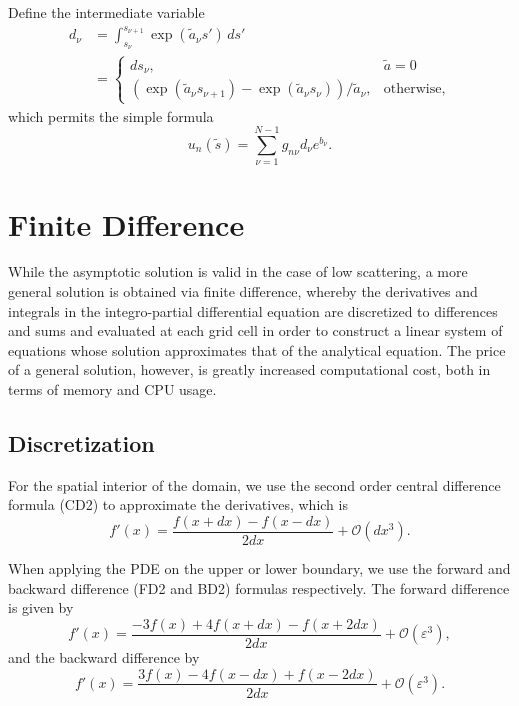 Define the intermediate variable
\begin{align*}
  d_\nu &= \int_{s_\nu}^{s_{\nu+1}}  \exp\left(\tilde{a}_{\nu}s'\right)\, ds' \\
    &= \begin{cases}
    ds_\nu, & \tilde{a} = 0 \\
      \left( \exp(\tilde{a}_\nu s_{\nu+1}) - \exp(\tilde{a}_\nu s_\nu) \right)/\tilde{a}_\nu, & \mbox{otherwise},
    \end{cases}
\end{align*}
which permits the simple formula
\begin{equation}
  u_n(\tilde{s}) = \sum_{\nu=1}^{N-1} g_{n\nu}d_\nu e^{b_\nu}.
  \label{eqn:discrete_ray_integral}
\end{equation}

\section{Finite Difference}
While the asymptotic solution is valid in the case of low scattering, a more general solution is obtained via finite difference, whereby the derivatives and integrals in the integro-partial differential equation are discretized to differences and sums and evaluated at each grid cell in order to construct a linear system of equations whose solution approximates that of the analytical equation.
The price of a general solution, however, is greatly increased computational cost, both in terms of memory and CPU usage.

\subsection{Discretization}

For the spatial interior of the domain, we use the second order central difference formula (CD2) to approximate the derivatives, which is
\begin{equation*}
    f'(x) = \frac{f(x+dx)-f(x-dx)}{2dx} + \mathcal{O}(dx^3).
\end{equation*}

When applying the PDE on the upper or lower boundary, we use the forward and backward difference (FD2 and BD2) formulas respectively.
The forward difference is given by
\begin{equation*}
    \label{eq:FD2}
    f'(x) = \frac{-3f(x)+4f(x+dx)-f(x+2dx)}{2dx} + \mathcal{O}(\varepsilon^3),
\end{equation*}
and the backward difference by
\begin{equation*}
    \label{eq:BD2}
    f'(x) = \frac{3f(x)-4f(x-dx)+f(x-2dx)}{2dx} + \mathcal{O}(\varepsilon^3).
\end{equation*}

